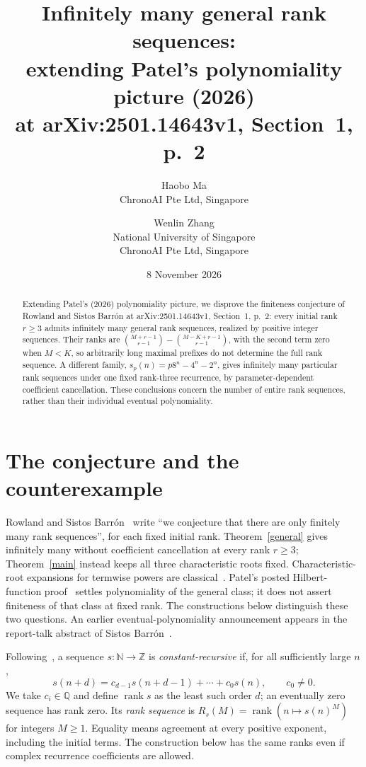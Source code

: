 \documentclass[11pt]{article}
\title{Infinitely many general rank sequences:\\
extending Patel's polynomiality picture (2026)\\
at arXiv:2501.14643v1, Section~1, p.~2}
\author{Haobo Ma\\\small ChronoAI Pte Ltd, Singapore
\and Wenlin Zhang\\\small National University of Singapore\\
\small ChronoAI Pte Ltd, Singapore}
\date{8 November 2026}
\DeclareMathOperator{\rank}{rank}
\newcommand{\Q}{\mathbb{Q}}
\newcommand{\Z}{\mathbb{Z}}
\newcommand{\N}{\mathbb{N}}
\begin{document}
\maketitle
\begin{abstract}
Extending Patel's (2026) polynomiality picture, we disprove the finiteness
conjecture of Rowland and Sistos Barr\'on at arXiv:2501.14643v1,
Section~1, p.~2: every initial rank $r\geq3$ admits infinitely many
general rank sequences, realized by positive integer sequences.
Their ranks are $\binom{M+r-1}{r-1}-\binom{M-K+r-1}{r-1}$, with the
second term zero when $M<K$, so arbitrarily long maximal prefixes do not
determine the full rank sequence. A different family,
$s_p(n)=p8^n-4^n-2^n$, gives infinitely many particular rank sequences
under one fixed rank-three recurrence, by parameter-dependent coefficient
cancellation. These conclusions concern the number of entire rank
sequences, rather than their individual eventual polynomiality.
\end{abstract}

\section{The conjecture and the counterexample}
Rowland and Sistos Barr\'on~\cite[Section~1, p.~2]{RSB} write
``we conjecture that there are only finitely many rank sequences'',
for each fixed initial rank. Theorem~\ref{general} gives infinitely many
without coefficient cancellation at every rank $r\geq3$;
Theorem~\ref{main} instead keeps all three characteristic roots fixed.
Characteristic-root expansions for termwise powers are
classical~\cite[Theorem~1]{Stinchcombe}. Patel's posted
Hilbert-function proof~\cite[equations~(17), (23)]{Patel}
settles polynomiality of the general class; it does not assert finiteness
of that class at fixed rank. The constructions below distinguish these
two questions.
An earlier eventual-polynomiality announcement appears in the report-talk
abstract of Sistos Barr\'on~\cite[PDF p.~23]{Sistos2023}.

Following~\cite[Section~2, p.~3]{RSB}, a sequence $s:\N\to\Z$ is
\emph{constant-recursive} if, for all sufficiently large $n$,
\[
 s(n+d)=c_{d-1}s(n+d-1)+\cdots+c_0s(n),\qquad c_0\ne0.
\]
We take $c_i\in\Q$ and define $\rank s$ as the least such order $d$;
an eventually zero sequence has rank zero. Its \emph{rank sequence} is
$R_s(M)=\rank(n\mapsto s(n)^M)$ for integers $M\geq1$.
Equality means agreement at every positive exponent, including the initial
terms. The construction below has the same ranks even if complex
recurrence coefficients are allowed.
\end{document}
